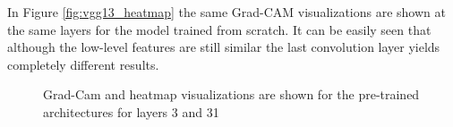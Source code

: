 In Figure \ref{fig:vgg13_heatmap} the same Grad-CAM visualizations are shown at the same layers for the model trained from scratch. It can be easily seen that although the low-level features are still similar the last convolution layer yields completely different results.

\begin{figure}[H]
\centering
\caption{Grad-Cam and heatmap visualizations are shown for the pre-trained architectures for layers 3 and 31}



\end{figure}
